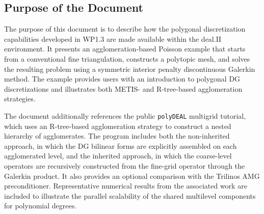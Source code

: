\documentclass[a4paper,12pt]{article}
\begin{document}
\subsection{{Purpose of the Document}}

The purpose of this document is to describe how the polygonal discretization
capabilities developed in WP1.3 are made available within the deal.II
environment. It presents an agglomeration-based Poisson example that starts
from a conventional fine triangulation, constructs a polytopic mesh, and
solves the resulting problem using a symmetric interior penalty discontinuous
Galerkin method. The example provides users with an introduction
to polygonal DG discretizations and illustrates both METIS- and R-tree-based
agglomeration strategies.


{
The document additionally references the public \texttt{polyDEAL} multigrid
tutorial, which uses an R-tree-based agglomeration strategy to construct a
nested hierarchy of agglomerates. The program includes both the non-inherited
approach, in which the DG bilinear forms are explicitly assembled on each
agglomerated level, and the inherited approach, in which the coarse-level
operators are recursively constructed from the fine-grid operator through the
Galerkin product. It also provides an optional comparison with the Trilinos
AMG preconditioner. Representative numerical results from the associated work are included
to illustrate the parallel scalability of the shared multilevel
components for polynomial degrees.
%
}


\end{document}
